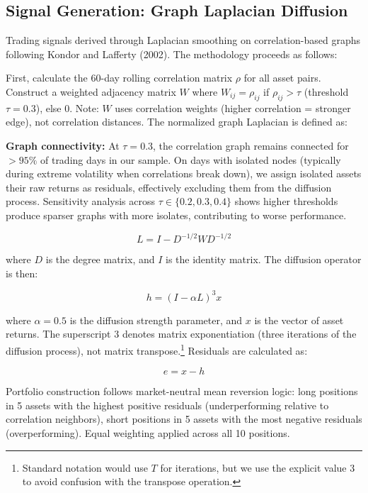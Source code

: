 \subsection{Signal Generation: Graph Laplacian Diffusion}

Trading signals derived through Laplacian smoothing on correlation-based graphs following Kondor and Lafferty (2002). The methodology proceeds as follows:

First, calculate the 60-day rolling correlation matrix $\rho$ for all asset pairs. Construct a weighted adjacency matrix $W$ where $W_{ij} = \rho_{ij}$ if $\rho_{ij} > \tau$ (threshold $\tau = 0.3$), else 0. Note: $W$ uses correlation weights (higher correlation = stronger edge), not correlation distances. The normalized graph Laplacian is defined as:

\textbf{Graph connectivity:} At $\tau = 0.3$, the correlation graph remains connected for $>95\%$ of trading days in our sample. On days with isolated nodes (typically during extreme volatility when correlations break down), we assign isolated assets their raw returns as residuals, effectively excluding them from the diffusion process. Sensitivity analysis across $\tau \in \{0.2, 0.3, 0.4\}$ shows higher thresholds produce sparser graphs with more isolates, contributing to worse performance.

\begin{equation}
L = I - D^{-1/2}WD^{-1/2}
\end{equation}

where $D$ is the degree matrix, and $I$ is the identity matrix. The diffusion operator is then:

\begin{equation}
h = (I - \alpha L)^3 x
\end{equation}

where $\alpha = 0.5$ is the diffusion strength parameter, and $x$ is the vector of asset returns. The superscript 3 denotes matrix exponentiation (three iterations of the diffusion process), not matrix transpose.\footnote{Standard notation would use $T$ for iterations, but we use the explicit value 3 to avoid confusion with the transpose operation.} Residuals are calculated as:

\begin{equation}
e = x - h
\end{equation}

Portfolio construction follows market-neutral mean reversion logic: long positions in 5 assets with the highest positive residuals (underperforming relative to correlation neighbors), short positions in 5 assets with the most negative residuals (overperforming). Equal weighting applied across all 10 positions.

